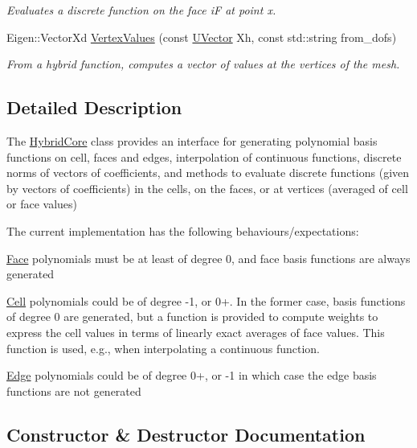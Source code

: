 \begin{DoxyCompactItemize}
\begin{DoxyCompactList}\small\item\em Evaluates a discrete function on the face iF at point x. \end{DoxyCompactList}\item 
Eigen\+::\+Vector\+Xd \hyperlink{classHArDCore3D_1_1HybridCore_a1d33ec0786b8127a161384ecf8f04018}{Vertex\+Values} (const \hyperlink{classHArDCore3D_1_1UVector}{U\+Vector} Xh, const std\+::string from\+\_\+dofs)
\begin{DoxyCompactList}\small\item\em From a hybrid function, computes a vector of values at the vertices of the mesh. \end{DoxyCompactList}\end{DoxyCompactItemize}


\subsection{Detailed Description}
The \hyperlink{classHArDCore3D_1_1HybridCore}{Hybrid\+Core} class provides an interface for generating polynomial basis functions on cell, faces and edges, interpolation of continuous functions, discrete norms of vectors of coefficients, and methods to evaluate discrete functions (given by vectors of coefficients) in the cells, on the faces, or at vertices (averaged of cell or face values)

The current implementation has the following behaviours/expectations\+:
\begin{DoxyItemize}
\item \hyperlink{classHArDCore3D_1_1Face}{Face} polynomials must be at least of degree 0, and face basis functions are always generated
\item \hyperlink{classHArDCore3D_1_1Cell}{Cell} polynomials could be of degree -\/1, or 0+. In the former case, basis functions of degree 0 are generated, but a function is provided to compute weights to express the cell values in terms of linearly exact averages of face values. This function is used, e.\+g., when interpolating a continuous function.
\item \hyperlink{classHArDCore3D_1_1Edge}{Edge} polynomials could be of degree 0+, or -\/1 in which case the edge basis functions are not generated 
\end{DoxyItemize}

\subsection{Constructor \& Destructor Documentation}
\mbox{\label{classHArDCore3D_1_1HybridCore_af74bfd2755cae90735669032bec84918}} 

